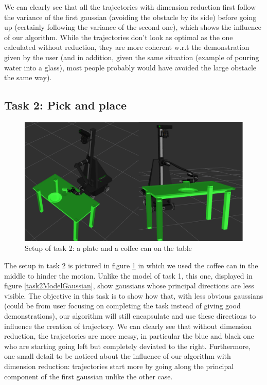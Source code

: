 \documentclass[letterpaper, 10 pt, conference]{ieeeconf}  %
\begin{document}
We can clearly see that all the trajectories with dimension reduction first follow the variance of the first gaussian (avoiding the obstacle by its side) before going up (certainly following the variance of the second one), which shows the influence of our algorithm. While the trajectories don't look as optimal as the one calculated without reduction, they are more coherent w.r.t the demonstration given by the user (and in addition, given the same situation (example of pouring water into a glass), most people probably would have avoided the large obstacle the same way). \\
\subsection{Task 2: Pick and place}
\begin{figure}[h]
	\centering
	\includegraphics[scale=0.2]{figure/task2Scenario.png}
	\caption{Setup of task 2: a plate and a coffee can on the table}
	\label{task2Scenario}
\end{figure}
The setup in task 2 is pictured in figure \ref{task2Scenario} in which we used the coffee can in the middle to hinder the motion. Unlike the model of task 1, this one, displayed in figure \ref{task2ModelGaussian}, show gaussians whose principal directions are less visible. The objective in this task is to show how that, with less obvious gaussians (could be from user focusing on completing the task instead of giving good demonstrations), our algorithm will still encapsulate and use these directions to influence the creation of trajectory.
We can clearly see that without dimension reduction, the trajectories are more messy, in particular the blue and black one who are starting going left but completely deviated to the right. Furthermore, one small detail to be noticed about the influence of our algorithm with dimension reduction: trajectories start more by going along the principal component of the first gaussian unlike the other case. 
\end{document}
